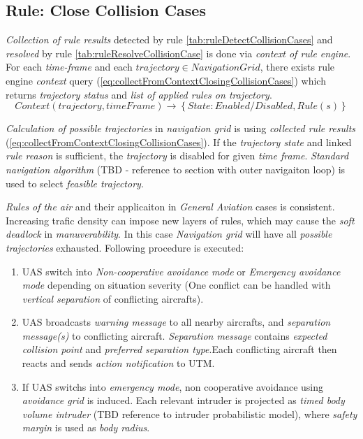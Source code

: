 \subsection{Rule: Close Collision Cases}\label{sec:ruleCloseCollisionCases}    
\noindent\emph{Collection of rule results} detected by rule \ref{tab:ruleDetectCollisionCases} and \emph{resolved} by rule \ref{tab:ruleResolveCollisionCase} is done via \emph{context of rule engine}. For each \emph{time-frame} and each $trajectory\in NavigationGrid$, there exists rule engine \emph{context} query (\ref{eq:collectFromContextClosingCollisionCases}) which returns \emph{trajectory status} and \emph{list of applied rules on trajectory}.
\begin{equation}\label{eq:collectFromContextClosingCollisionCases}
    Context(trajectory,timeFrame) \to \left\{State: Enabled/Disabled, Rule(s)\right\}
\end{equation}

\emph{Calculation of possible trajectories} in \emph{navigation grid} is using \emph{collected rule results} (\ref{eq:collectFromContextClosingCollisionCases}). If the \emph{trajectory state} and linked \emph{rule reason} is sufficient, the \emph{trajectory} is disabled for given \emph{time frame}. \emph{Standard navigation algorithm} (TBD - reference to section with outer navigaiton loop) is used to select \emph{feasible trajectory}. 

\emph{Rules of the air} and their applicaiton in \emph{General Aviation} cases is consistent. Increasing trafic density can impose new layers of rules, which may cause the \emph{soft deadlock} in \emph{manuverability}. In this case \emph{Navigation grid} will have all  \emph{possible trajectories} exhausted. Following procedure is executed:
\begin{enumerate}
    \item UAS switch into \emph{Non-cooperative avoidance mode} or \emph{Emergency avoidance mode} depending on situation severity (One conflict can be handled with \emph{vertical separation} of conflicting aircrafts).
    \item UAS broadcasts \emph{warning message} to all nearby aircrafts, and \emph{separation message(s)} to conflicting aircraft. \emph{Separation message} contains \emph{expected collision point} and \emph{preferred separation type}.Each conflicting aircraft then reacts and sends \emph{action notification} to UTM.
    \item If UAS switchs into \emph{emergency mode}, non cooperative avoidance using \emph{avoidance grid} is induced. Each relevant intruder is projected as \emph{timed body volume intruder} (TBD reference to intruder probabilistic model), where \emph{safety margin} is used as \emph{body radius}.
\end{enumerate}

